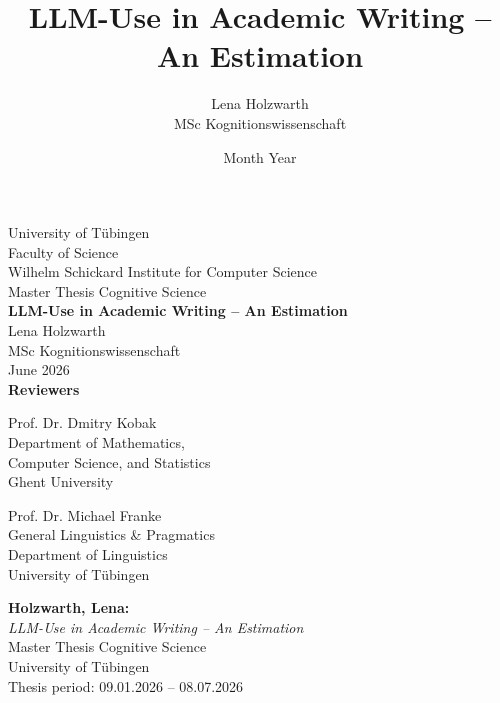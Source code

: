\documentclass[12pt,a4paper]{report}
\title{\textbf{LLM-Use in Academic Writing -- An Estimation}}
\author{Lena Holzwarth\\MSc Kognitionswissenschaft}
\date{Month Year}
\begin{document}



\begin{titlepage}
 \begin{center}
  {\LARGE University of T\"ubingen}\\
  {\large Faculty of Science \\
    Wilhelm Schickard Institute for Computer Science\\[4cm]}
  {\huge Master Thesis Cognitive Science\\[2cm]}
  {\Large\textbf{LLM-Use in Academic Writing -- An Estimation}\\[1.5cm]}
  {\large Lena Holzwarth\\MSc Kognitionswissenschaft}\\[0.5cm]
  June 2026\\[3cm]
  {\small\bf Reviewers}\\[0.5cm]
  \parbox{7cm}{\begin{center}{\large Prof. Dr. Dmitry Kobak}\\
  {\footnotesize Department of
Mathematics, \\Computer Science, and Statistics\\
	Ghent University}\end{center}}\hfill\parbox{7cm}{\begin{center}
  {\large Prof. Dr. Michael Franke}\\
  {\footnotesize General Linguistics \& Pragmatics\\Department of Linguistics\\
	University of T\"ubingen}\end{center}
 }
  \end{center}
\end{titlepage}



\thispagestyle{empty}
\vspace*{\fill}
\begin{minipage}{11.2cm}
\textbf{Holzwarth, Lena:}\\
\emph{LLM-Use in Academic Writing -- An Estimation}\\ Master Thesis Cognitive Science\\
University of T\"ubingen\\
Thesis period: 09.01.2026 -- 08.07.2026
\end{minipage}
\newpage
\end{document}
